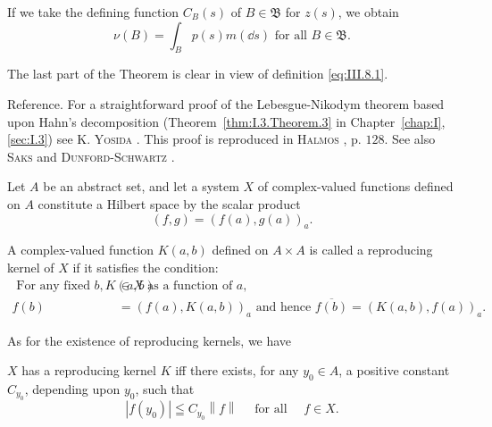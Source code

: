 If we take the defining function $C_B(s)$ of $B \in \mathfrak{B}$ for $z(s)$, we obtain 
\[
\nu (B) = \int_{B} p (s) m (\dd s) \text{ for all } B \in \mathfrak {B}.
\]

The last part of the Theorem is clear in view of definition \eqref{eq:III.8.1}. 

Reference. For a straightforward proof of the Lebesgue-Nikodym theorem based upon Hahn's decomposition (Theorem~\ref{thm:I.3.Theorem.3} in Chapter~\ref{chap:I}, \ref{sec:I.3}) see K. \textsc{Yosida} \cite{yosida345}. This proof is reproduced in \textsc{Halmos} \cite{halmos92}, p. $128$. See also \textsc{Saks} \cite{saks280} and \textsc{Dunford}-\textsc{Schwartz} \cite{dunford44}. 


\label{sec:III.9}

Let $A$ be an abstract set, and let a system $X$ of complex-valued functions defined on $A$ constitute a Hilbert space by the scalar product 
\begin{equation}\label{eq:III.9.1}
(f, g) = (f (a), g (a)) _{a}.
\end{equation}

A complex-valued function $K(a, b)$ defined on $A \times A$ is called a reproducing kernel of $X$ if it satisfies the condition: 
\begin{align}
\text{ For any fixed } b, K (a, b)& \in X \text{ as a function of } a, \label{eq:III.9.2} \\
f (b)& = \left(f (a), K (a, b)\right) _{a} \text{ and hence } \overline {{f (b)}} = \left(K (a, b), f (a)\right) _{a}. \label{eq:III.9.3}
\end{align}

As for the existence of reproducing kernels, we have 

\begin{theorem}\label{thm:III.9.Theorem.1} $X$ has a reproducing kernel $K$ iff there exists, for any $y_{0} \in A$, a positive constant $C_{y_{0}}$, depending upon $y_{0}$, such that 
\begin{equation}\label{eq:III.9.4}
\left| f \left(y _{0}\right) \right| \leqq C _ {y _{0}} \left\| f \right\| \quad \text{ for all } \quad f \in X.
\end{equation}
\end{theorem}

